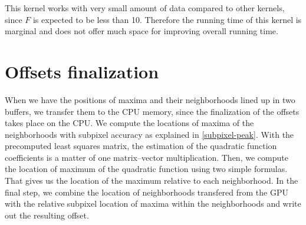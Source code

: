 This kernel works with very small amount of data compared to other kernels, since $F$ is expected to be less than 10. Therefore the running time of this kernel is marginal and does not offer much space for improving overall running time.

\section{Offsets finalization}

When we have the positions of maxima and their neighborhoods lined up in two buffers, we transfer them to the CPU memory, since the finalization of the offsets takes place on the CPU. We compute the locations of maxima of the neighborhoods with subpixel accuracy as explained in \cref{subpixel-peak}. With the precomputed least squares matrix, the estimation of the quadratic function coefficients is a matter of one matrix--vector multiplication. Then, we compute the location of maximum of the quadratic function using two simple formulas. That gives us the location of the maximum relative to each neighborhood. In the final step, we combine the location of neighborhoods transfered from the GPU with the relative subpixel location of maxima within the neighborhoods and write out the resulting offset.
